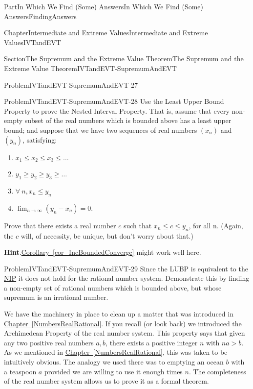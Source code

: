 \documentclass[oneside,10pt,]{book}
\newcommand{\blocktitlefont}{\relax}
\newcommand{\xreffont}{\relax}
\numberwithin{equation}{part}
\newcommand{\QQ}{\mathbb {Q}}
\begin{document}
\begin{partptx}{Part}{In Which We Find (Some) Answers}{}{In Which We Find (Some) Answers}{}{}{FindingAnswers}
\begin{chapterptx}{Chapter}{Intermediate and Extreme Values}{}{Intermediate and Extreme Values}{}{}{IVTandEVT}
\begin{sectionptx}{Section}{The Supremum and the Extreme Value Theorem}{}{The Supremum and the Extreme Value Theorem}{}{}{IVTandEVT-SupremumAndEVT}
\begin{problem}{Problem}{}{IVTandEVT-SupremumAndEVT-27}
\end{problem}
\begin{problem}{Problem}{}{IVTandEVT-SupremumAndEVT-28}%
 Use the Least Upper Bound Property to prove the Nested Interval Property. That is, assume that every non-empty subset of the real numbers which is bounded above has a least upper bound; and suppose that we have two sequences of real numbers \(\left(x_n\right)\) and \(\left(y_n\right)\), satisfying:%
\begin{enumerate}
\item{}\(\displaystyle x_1\le x_2 \le x_3 \le \ldots\)%
\item{}\(\displaystyle y_1\ge y_2 \ge y_3 \ge \ldots\)%
\item{}\(\displaystyle \forall\ n, x_n\le y_n\)%
\item{}\(\displaystyle\lim_{n\rightarrow\infty}\left(y_n-x_n\right) = 0\).%
\end{enumerate}
%
\par
Prove that there exists a real number \(c\) such that \(x_n\le c\le y_n\), for all n. (Again, the \(c\) will, of necessity, be unique, but don't worry about that.)%
\par\smallskip%
\noindent\textbf{\blocktitlefont Hint}.\hypertarget{IVTandEVT-SupremumAndEVT-28-2}{}\quad{}\hyperref[cor_IncBoundedConverge]{Corollary~{\xreffont\ref{cor_IncBoundedConverge}}} might work well here.%
\end{problem}
\begin{problem}{Problem}{}{IVTandEVT-SupremumAndEVT-29}%
\index{Least Upper Bound Property (LUBP)!doesn't hold in \(\QQ\)} Since the LUBP is equivalent to the \hyperref[NIP]{NIP} it does not hold for the rational number system. Demonstrate this by finding a non-empty set of rational numbers which is bounded above, but whose supremum is an irrational number.%
\end{problem}
We have the machinery in place to clean up a matter that was introduced in \hyperref[NumbersRealRational]{Chapter~{\xreffont\ref{NumbersRealRational}}}. If you recall (or look back) we introduced the Archimedean Property of the real number system. This property says that given any two positive real numbers \(a, b\), there exists a positive integer \(n\) with \(na>b\). As we mentioned in \hyperref[NumbersRealRational]{Chapter~{\xreffont\ref{NumbersRealRational}}}, this was taken to be intuitively obvious. The analogy we used there was to emptying an ocean \(b\) with a teaspoon \(a\) provided we are willing to use it enough times \(n\). The completeness of the real number system allows us to prove it as a formal theorem.%

\end{sectionptx}
\end{chapterptx}
\end{partptx}
\end{document}
